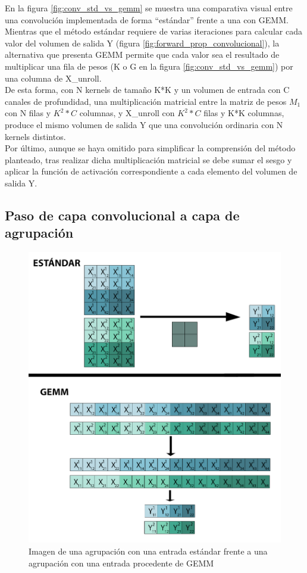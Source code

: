 En la figura \ref{fig:conv_std_vs_gemm} se muestra una comparativa visual entre una convolución implementada de forma ``estándar'' frente a una con GEMM. \\
Mientras que el método estándar requiere de varias iteraciones para calcular cada valor del volumen de salida Y (figura \ref{fig:forward_prop_convolucional}), la alternativa que presenta GEMM permite que cada valor sea el resultado de multiplicar una fila de pesos (K o G en la figura \ref{fig:conv_std_vs_gemm}) por una columna de X\_unroll. \cite{Programming_Massively} \\
De esta forma, con N kernels de tamaño K*K y un volumen de entrada con C canales de profundidad, una multiplicación matricial entre la matriz de pesos $M_1$ con N filas y $K^2*C$ columnas, y X\_unroll con $K^2*C$ filas y K*K columnas, produce el mismo volumen de salida Y que una convolución ordinaria con N kernels distintos. \\
Por último, aunque se haya omitido para simplificar la comprensión del método planteado, tras realizar dicha multiplicación matricial se debe sumar el sesgo y aplicar la función de activación correspondiente a cada elemento del volumen de salida Y.

\subsection{Paso de capa convolucional a capa de agrupación}

\begin{figure}[H]
	\centering
	\includegraphics[scale=0.35]{imagenes/maxpool_std_vs_gemm.jpg}  
	\caption{Imagen de una agrupación con una entrada estándar frente a una agrupación con una entrada procedente de GEMM}
	\label{fig:maxpool_std_vs_gemm}
\end{figure}